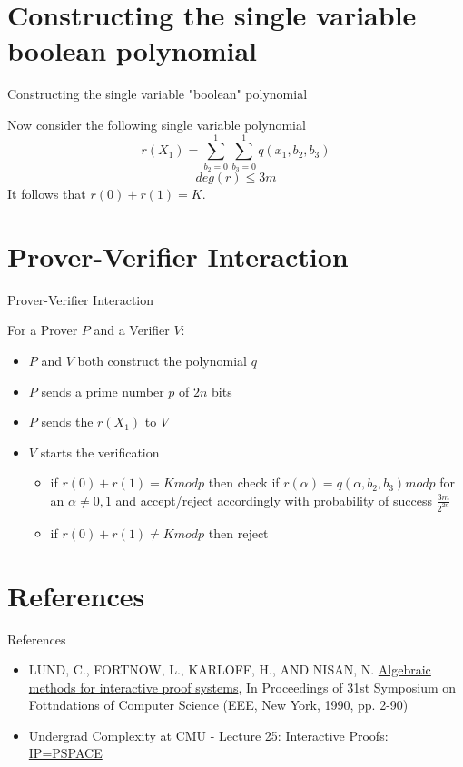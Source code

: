 \documentclass{beamer}
\begin{document}
\section{Constructing the single variable boolean polynomial}

\begin{frame}{Constructing the single variable "boolean" polynomial}
  \begin{block}{}
    Now consider the following single variable polynomial
    $$r(X_1) = \sum_{b_2=0}^1 \sum_{b_3=0}^1 q(x_1,b_2,b_3)$$
    $$deg(r) \leq 3m$$
    It follows that $r(0)+r(1)=K$.
  \end{block}
\end{frame}

\section{Prover-Verifier Interaction}

\begin{frame}{Prover-Verifier Interaction}
  \begin{block}{}
    For a Prover $P$ and a Verifier $V$:
    \begin{itemize}
      \item $P$ and $V$ both construct the polynomial $q$
      \item $P$ sends a prime number $p$ of $2n$ bits
      \item $P$ sends the $r(X_1)$ to $V$
      \item $V$ starts the verification
        \begin{itemize}
          \item if $r(0)+r(1)=K modp$ then check if $r(\alpha) = q(\alpha,b_2,b_3) modp$ for an $\alpha \neq 0,1$ and accept/reject accordingly with probability of success $\frac{3m}{2^{2n}}$
          \item if $r(0)+r(1)\neq K modp$ then reject
        \end{itemize}
    \end{itemize}
  \end{block}
\end{frame}

\section{References}

\begin{frame}{References}
  \begin{itemize}
    \item LUND, C., FORTNOW, L., KARLOFF, H., AND NISAN, N. 
      \href{https://users.cs.fiu.edu/~giri/teach/5420/f01/LundIPS.pdf}{Algebraic methods for interactive proof systems},
      In Proceedings of 31st Symposium on Fottndations of Computer Science (EEE, New York, 1990, pp. 2-90)
    \item \href{https://www.youtube.com/watch?v=yS9WrISP_Ug&list=PLm3J0oaFux3YL5vLXpzOyJiLtqLp6dCW2&index=26}{Undergrad Complexity at CMU - Lecture 25: Interactive Proofs: IP=PSPACE}
  \end{itemize}
\end{frame}
\end{document}
